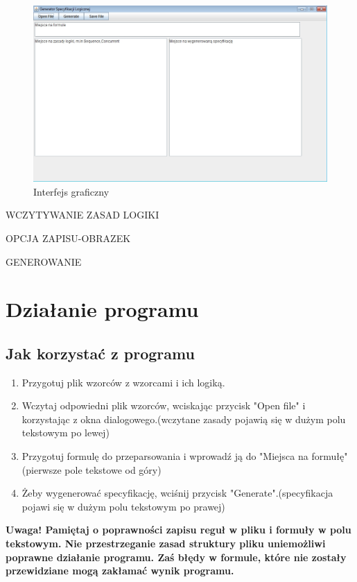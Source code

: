 \documentclass[a4paper, 11pt]{article}
\begin{document}
	\begin{figure}[H]
	\centerline{\includegraphics[scale=0.6]{GUI}}
	\caption{Interfejs graficzny}
	\end{figure}%
	
	WCZYTYWANIE ZASAD LOGIKI	
	
	OPCJA ZAPISU-OBRAZEK
	
	GENEROWANIE
	
	
	
	\section{Działanie programu}
	\subsection{Jak korzystać z programu}
	\begin{enumerate}
	\item Przygotuj plik wzorców z wzorcami i ich logiką.
	\item Wczytaj odpowiedni plik wzorców, wciskając przycisk "Open file" i korzystając z okna dialogowego.(wczytane zasady pojawią się w dużym polu tekstowym po lewej)
	\item Przygotuj formulę do przeparsowania i wprowadź ją do "Miejsca na formułę"(pierwsze pole tekstowe od góry)
	\item Żeby wygenerować specyfikację, wciśnij przycisk "Generate".(specyfikacja pojawi się w dużym polu tekstowym po prawej)
	\end{enumerate}
	
	\textbf{ Uwaga! Pamiętaj o poprawności zapisu reguł w pliku i formuły w polu tekstowym. Nie przestrzeganie zasad struktury pliku uniemożliwi poprawne działanie programu. Zaś błędy w formule, które nie zostały przewidziane mogą zakłamać wynik programu.}
	
\end{document}
